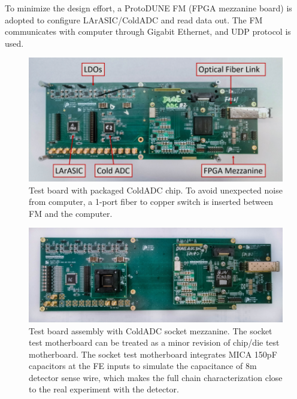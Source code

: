 To minimize the design effort, a ProtoDUNE FM (FPGA mezzanine board) is adopted to configure LArASIC/ColdADC and read data out.  The FM communicates with computer through Gigabit Ethernet, and UDP protocol is used.
\begin{figure}[!ht]
\centering
 \includegraphics[width=0.85\linewidth]{figures/BNL_testbd1.png}
  \caption{Test board with packaged ColdADC chip. To avoid unexpected noise from computer, a 1-port fiber to copper switch is inserted between FM and the computer.}
  \label{fig:bnl_testbd1}
\end{figure}
\begin{figure}[!ht]
\centering
 \includegraphics[width=0.85\linewidth]{figures/BNL_testbd2.png}
  \caption{Test board assembly with ColdADC socket mezzanine. The socket test motherboard can be treated as a minor revision of chip/die test motherboard. The socket test motherboard integrates MICA 150pF capacitors at the FE inputs to simulate the capacitance of 8m detector sense wire, which makes the full chain characterization close to the real experiment with the detector.}
  \label{fig:bnl_testbd2}
\end{figure}
